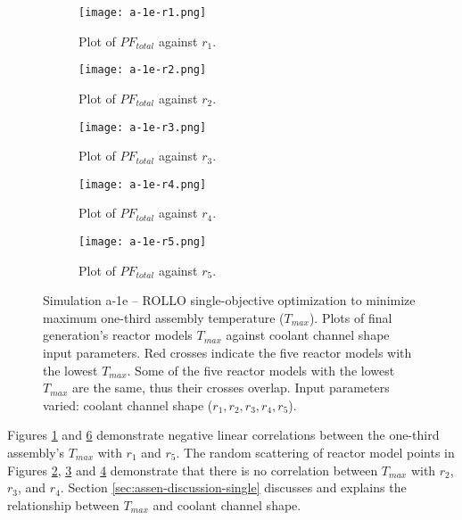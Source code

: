 \begin{figure}[htbp!]
    \ContinuedFloat
    \centering
    \begin{subfigure}{0.49\textwidth}
        \texttt{[image: a-1e-r1.png]}
        \caption{Plot of $PF_{total}$ against $r_1$.}
        \label{fig:a-1e-r1} 
    \end{subfigure}
    \begin{subfigure}{0.49\textwidth}
        \texttt{[image: a-1e-r2.png]}
        \caption{Plot of $PF_{total}$ against $r_2$.}
        \label{fig:a-1e-r2} 
    \end{subfigure}
    \begin{subfigure}{0.49\textwidth}
        \texttt{[image: a-1e-r3.png]}
        \caption{Plot of $PF_{total}$ against $r_3$.}
        \label{fig:a-1e-r3} 
    \end{subfigure}
    \begin{subfigure}{0.49\textwidth}
        \texttt{[image: a-1e-r4.png]}
        \caption{Plot of $PF_{total}$ against $r_4$.}
        \label{fig:a-1e-r4} 
    \end{subfigure}
    \begin{subfigure}{0.49\textwidth}
        \texttt{[image: a-1e-r5.png]}
        \caption{Plot of $PF_{total}$ against $r_5$.}
        \label{fig:a-1e-r5} 
    \end{subfigure}
    \caption{Simulation a-1e -- ROLLO single-objective optimization to minimize 
    maximum one-third assembly temperature ($T_{max}$). 
    Plots of final generation's reactor models $T_{max}$ against 
    coolant channel shape input parameters. 
    Red crosses indicate the five reactor models with the lowest $T_{max}$.
    Some of the five reactor models with the lowest $T_{max}$ are the same, thus 
    their crosses overlap.
    Input parameters varied: coolant channel shape ($r_1, r_2, r_3, r_4, r_5$).}
\end{figure}

Figures \ref{fig:a-1e-r1} and \ref{fig:a-1e-r5} demonstrate negative linear 
correlations between the one-third assembly's $T_{max}$ with $r_1$ and $r_5$. 
The random scattering of reactor model points in Figures \ref{fig:a-1e-r2}, 
\ref{fig:a-1e-r3} and \ref{fig:a-1e-r4} demonstrate that 
there is no correlation between $T_{max}$ with $r_2$, $r_3$, and $r_4$. 
Section \ref{sec:assen-discussion-single} discusses and explains the relationship 
between $T_{max}$ and coolant channel shape. 

